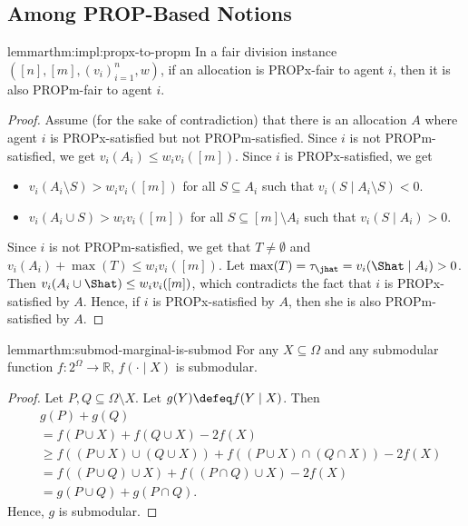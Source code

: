 \subsection{Among PROP-Based Notions}
\label{sec:impls-extra:among-prop-based}

\begin{restatable}{lemma}{rthm:impl:propx-to-propm}
\label{thm:impl:propx-to-propm}
In a fair division instance $([n], [m], (v_i)_{i=1}^n, w)$,
if an allocation is PROPx-fair to agent $i$, then it is also PROPm-fair to agent $i$.
\end{restatable}
\begin{proof}
Assume (for the sake of contradiction) that there is an allocation $A$ where
agent $i$ is PROPx-satisfied but not PROPm-satisfied.
%
Since $i$ is not PROPm-satisfied, we get $v_i(A_i) \le w_iv_i([m])$.
Since $i$ is PROPx-satisfied, we get

\begin{itemize}
\item $v_i(A_i \setminus S) > w_iv_i([m])$ for all $S \subseteq A_i$ such that
    $v_i(S \mid A_i \setminus S) < 0$.
\item $v_i(A_i \cup S) > w_iv_i([m])$ for all $S \subseteq [m] \setminus A_i$
    such that $v_i(S \mid A_i) > 0$.
\end{itemize}

Since $i$ is not PROPm-satisfied, we get that $T \neq \emptyset$ and $v_i(A_i) + \max(T) \le w_iv_i([m])$.
Let $\max(T) = \tau_{\jhat} = v_i(\Shat \mid A_i) > 0$.
Then $v_i(A_i \cup \Shat) \le w_iv_i([m])$, which contradicts the fact that
$i$ is PROPx-satisfied by $A$.
Hence, if $i$ is PROPx-satisfied by $A$, then she is also PROPm-satisfied by $A$.
\end{proof}

\begin{restatable}{lemma}{rthm:submod-marginal-is-submod}
\label{thm:submod-marginal-is-submod}
For any $X \subseteq \Omega$ and any submodular function $f: 2^{\Omega} \to \mathbb{R}$,
$f(\cdot \mid X)$ is submodular.
\end{restatable}
\begin{proof}
Let $P, Q \subseteq \Omega \setminus X$. Let $g(Y) \defeq f(Y \mid X)$. Then
\begin{align*}
& g(P) + g(Q)
\\ &= f(P \cup X) + f(Q \cup X) - 2f(X)
\\ &\ge f((P \cup X) \cup (Q \cup X)) + f((P \cup X) \cap (Q \cap X)) - 2f(X)
    \tag{by $f$'s submodularity}
\\ &= f((P \cup Q) \cup X) + f((P \cap Q) \cup X) - 2f(X)
    \tag{by De Morgan's law}
\\ &= g(P \cup Q) + g(P \cap Q).
\end{align*}
Hence, $g$ is submodular.
\end{proof}

